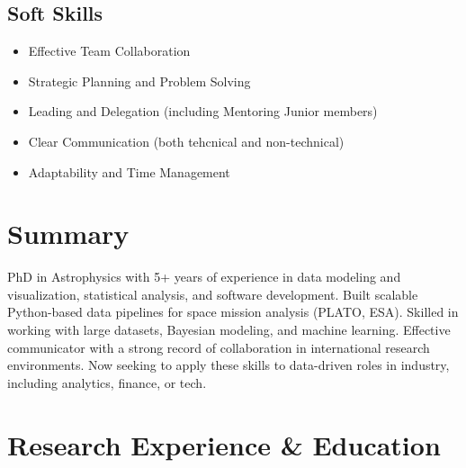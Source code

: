 \documentclass[11pt,a4paper]{article}
\begin{document}
\begin{multicols}{2}
		\subsection{Soft Skills}
		
		\begin{itemize}
			\item Effective Team Collaboration
			\item Strategic Planning and Problem Solving
			\item Leading and Delegation (including Mentoring Junior members)
			\item Clear Communication (both tehcnical and non-technical)
			\item Adaptability and Time Management
		\end{itemize}
		
		\section{Summary}
		PhD in Astrophysics with 5+ years of experience in data modeling and visualization, statistical analysis, and software development. Built scalable Python-based data pipelines for space mission analysis (PLATO, ESA). Skilled in working with large datasets, Bayesian modeling, and machine learning. Effective communicator with a strong record of collaboration in international research environments. Now seeking to apply these skills to data-driven roles in industry, including analytics, finance, or tech.
		
		\section{Research Experience \& Education}
		
		

\end{multicols}
\end{document}

